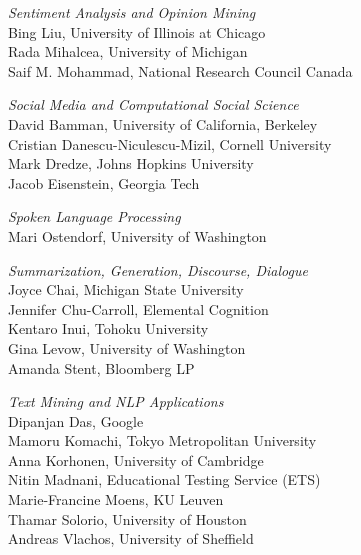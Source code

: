 \documentclass[11pt]{article}
\begin{document}
\emph{Sentiment Analysis and Opinion Mining} \\
\hspace*{0.2in} Bing Liu, University of Illinois at Chicago \\
\hspace*{0.2in} Rada Mihalcea, University of Michigan \\
\hspace*{0.2in} Saif M. Mohammad, National Research Council Canada



\emph{Social Media and Computational Social Science} \\
\hspace*{0.2in} David Bamman, University of California, Berkeley \\
\hspace*{0.2in} Cristian Danescu-Niculescu-Mizil, Cornell University \\
\hspace*{0.2in} Mark Dredze, Johns Hopkins University \\
\hspace*{0.2in} Jacob Eisenstein, Georgia Tech


\emph{Spoken Language Processing} \\
\hspace*{0.2in} Mari Ostendorf, University of Washington


\emph{Summarization, Generation, Discourse, Dialogue} \\
\hspace*{0.2in} Joyce Chai,  Michigan State University   \\
\hspace*{0.2in} Jennifer Chu-Carroll,  Elemental Cognition  \\
\hspace*{0.2in} Kentaro Inui, Tohoku University  \\
\hspace*{0.2in} Gina Levow, University of Washington  \\
\hspace*{0.2in} Amanda Stent, Bloomberg LP 


\emph{
Text Mining and NLP Applications
} \\
\hspace*{0.2in} Dipanjan Das, Google \\
\hspace*{0.2in} Mamoru Komachi,  Tokyo Metropolitan University  \\
\hspace*{0.2in} Anna Korhonen, University of Cambridge  \\
\hspace*{0.2in} Nitin Madnani, Educational Testing Service (ETS)  \\
\hspace*{0.2in} Marie-Francine Moens, KU Leuven  \\
\hspace*{0.2in} Thamar Solorio, University of Houston  \\
\hspace*{0.2in} Andreas Vlachos, University of Sheffield 
\end{document}
